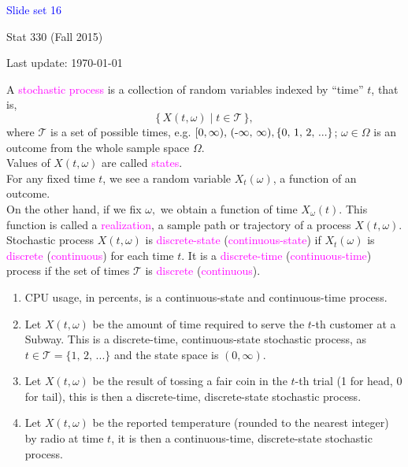 \documentclass[20pt,landscape]{foils}
\newcommand{\no}{\noindent}
\newcommand{\bul}{\hspace*{.3in}{\textcolor{red}{$\bullet$ \ }}}
\begin{document}
\LogoOff

\foilhead[1.3in]{}
\centerline{\LARGE \textcolor{blue}{Slide set 16}}
\vspace{0.3in}
\centerline{\large Stat 330 (Fall 2015)}
\vspace{0.2in}
\centerline{\tiny Last update: \today}
\setcounter{page}{0}

\foilhead[-.8in]{\textcolor{blue}{Stochastic Processes}}
\no \bul  A {\textcolor{magenta}{stochastic process}} is a collection of random variables
indexed by {}``time'' $t$, that is, \[
\{\, X(t,\omega)\mid t\in\mathcal{T}\,\},\]
where $\mathcal{T}$ is a set of possible times, e.g. $[0,\infty),\,\text{(-\ensuremath{\infty}, \ensuremath{\infty}),\,\{0, 1, 2, ...\}}$;
$\omega\in\Omega$ is an outcome from the whole sample space $\Omega$.\\[.1in]
\no \bul  Values of $X(t,\omega)$ are called {\textcolor{magenta}{states}}.\\[.1in]
\no \bul For any fixed time $t$, we see a random variable $X_{t}(\omega)$,
a function of an outcome. \\[.1in]
\no \bul On the other hand, if we fix $\omega,$ we
obtain a function of time $X_{\omega}(t)$. This function is called
a {\textcolor{magenta}{realization}}, a sample path or trajectory of a process $X(t,\omega)$.\\[.1in]
\no Stochastic process $X(t,\omega)$ is {\textcolor{magenta}{discrete-state}} ({\textcolor{magenta}{continuous-state}})
if $X_{t}(\omega)$ is {\textcolor{magenta}{discrete}} ({\textcolor{magenta}{continuous}}) for
each time $t$. It is a {\textcolor{magenta}{discrete-time}} ({\textcolor{magenta}{continuous-time}})
process if the set of times $\mathcal{T}$ is {\textcolor{magenta}{discrete}} ({\textcolor{magenta}{continuous}}).   
   
\foilhead[-.8in]{\textcolor{blue}{Examples}}   
\begin{enumerate}
\item CPU usage, in percents, is a continuous-state and continuous-time process.
\item Let $X(t,\omega)$ be the amount of time required to serve
the $t$-th customer at a Subway. This is a discrete-time, continuous-state stochastic
process, as $t\in\mathcal{T}=\{1,\,2,\,...\}$ and the state space
is $(0,\infty)$.
\item Let $X(t,\omega)$ be the result of tossing a fair coin in the $t$-th
trial (1 for head, 0 for tail), this is then a discrete-time, discrete-state
stochastic process.
\item Let $X(t,\omega)$ be the reported temperature (rounded to the nearest integer) by radio at time $t$,
it is then a continuous-time, discrete-state stochastic process.
\end{enumerate}
\end{document}
